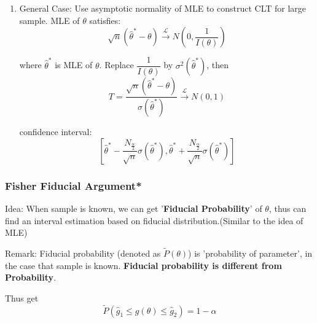 \documentclass[11pt,a4paper]{ctexart}
\numberwithin{equation}{section}%
\begin{document}
\begin{enumerate}


    
    \item General Case: Use asymptotic normality of MLE to construct CLT for large sample. MLE of $\theta$ satisfies:
    \[
        \sqrt{n}(\hat{\theta}^*-\theta)\xrightarrow[]{\mathscr{L}}N(0,\frac{1}{I(\theta)})
    \]

    where $\hat{\theta}^*$ is MLE of $\theta$. Replace $\dfrac{1}{I(\theta)}$ by $\sigma^2(\hat{\theta}^*)$, then
    \[
        T=\frac{\sqrt{n}(\hat{\theta}^*-\theta)}{\sigma(\hat{\theta}^*)}\xrightarrow[]{\mathscr{L}}N(0,1)    
    \]

    confidence interval:
    \[
        \left[\hat{\theta}^*-\frac{N_{\frac{\alpha}{2}}}{\sqrt{n}}\sigma(\hat{\theta}^*),\hat{\theta}^*+\frac{N_{\frac{\alpha}{2}}}{\sqrt{n}}\sigma(\hat{\theta}^*)\right]
    \]
    \end{enumerate}

\subsubsection{Fisher Fiducial Argument*}\label{SubSectionFisherFiducialArgument}
    Idea: When sample is known, we can get '\textbf{Fiducial Probability}' of $\theta$, thus can find an interval estimation based on fiducial distribution.(Similar to the idea of MLE)

    Remark: Fiducial probability (denoted as $\tilde{P}(\theta)$) is 'probability of parameter', in the case that sample is known. \textbf{Fiducial probability is different from Probability}.

    Thus get
    \[
        \tilde{P}(\hat{g}_1\leq g(\theta)\leq \hat{g}_2)=1-\alpha
    \]
\end{document}
